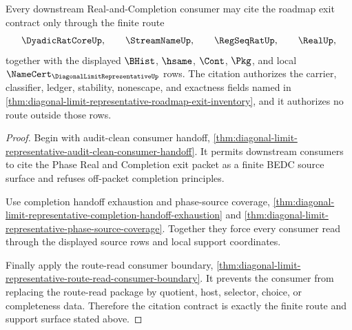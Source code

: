 \begin{theorem}
\label{thm:diagonal-limit-representative-roadmap-exit-consumer-contract}
Every downstream Real-and-Completion consumer may cite the roadmap exit contract only through the finite route
$$
\DyadicRatCoreUp,\qquad \StreamNameUp,\qquad \RegSeqRatUp,\qquad \RealUp,
$$
together with the displayed $\BHist$, $\hsame$, $\Cont$, $\Pkg$, and local $\NameCert_{\DiagonalLimitRepresentativeUp}$ rows. The citation authorizes the carrier, classifier, ledger, stability, nonescape, and exactness fields named in \autoref{thm:diagonal-limit-representative-roadmap-exit-inventory}, and it authorizes no route outside those rows.
\end{theorem}
\begin{proof}
Begin with audit-clean consumer handoff, \autoref{thm:diagonal-limit-representative-audit-clean-consumer-handoff}. It permits downstream consumers to cite the Phase Real and Completion exit packet as a finite BEDC source surface and refuses off-packet completion principles.

Use completion handoff exhaustion and phase-source coverage, \autoref{thm:diagonal-limit-representative-completion-handoff-exhaustion} and \autoref{thm:diagonal-limit-representative-phase-source-coverage}. Together they force every consumer read through the displayed source rows and local support coordinates.

Finally apply the route-read consumer boundary, \autoref{thm:diagonal-limit-representative-route-read-consumer-boundary}. It prevents the consumer from replacing the route-read package by quotient, host, selector, choice, or completeness data. Therefore the citation contract is exactly the finite route and support surface stated above.
\end{proof}

